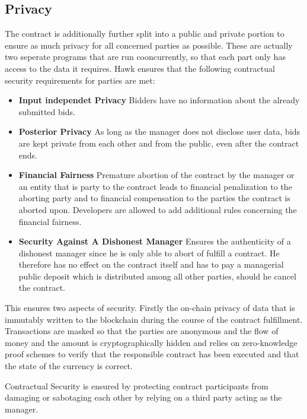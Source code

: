 \subsection{Privacy}
The contract is additionally further split into a public and private portion to ensure as much privacy for all concerned parties as possible. These are actually two seperate programs that are run cooncurrently, so that each part only has access to the data it requires.
Hawk ensures that the following contractual security requirements for parties are met:\cite[p.841]{Hawk}
\begin{itemize}
\item \textbf{Input independet Privacy}
Bidders have no information about the already submitted bids.
\item \textbf{Posterior Privacy}
As long as the manager does not disclose user data, bids are kept private from each other and from the public, even after the contract ends.
\item \textbf{Financial Fairness}
Premature abortion of the contract by the manager or an entity that is party to the contract leads to financial penalization to the aborting party and to financial compensation to the parties the contract is aborted upon. Developers are allowed to add additional rules concerning the financial fairness.
\item \textbf{Security Against A Dishonest Manager}
Ensures the authenticity of a dishonest manager since he is only able to abort of fulfill a contract. He therefore has no effect on the contract itself and has to pay a managerial public deposit which is distributed among all other parties, should he cancel the contract.
\end{itemize}

This ensures two aspects of security. Firstly the on-chain privacy of data that is immutably written to the blockchain during the course of the contract fulfillment. Transactions are masked so that the parties are anonymous and the flow of money and the amount is cryptographically hidden and relies on zero-knowledge proof schemes to verify that the responsible contract has been executed and that the state of the currency is correct.

Contractual Security is ensured by protecting contract participants from damaging or sabotaging each other by relying on a third party acting as the manager.


